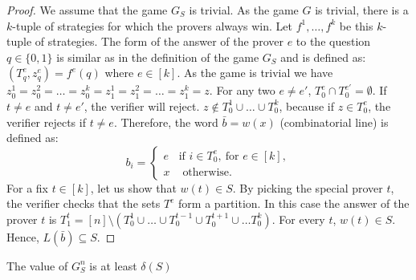 \begin{proof}
We assume that the game $G_S$ is trivial. As the game $G$ is trivial, there is a $k$-tuple of strategies for which the provers  always win.  Let $f^1, \ldots, f^k$ be this $k$-tuple of  strategies. The form of the answer of the prover $e$ to the question $q \in \{0,1\}$ is similar as in the definition of the game $G_S$ and is defined as: $(T_q^e, z_q^e)=f^e(q)$ where $e \in [k]$.  As the game is trivial we have $z_0^1=z_0^2= \ldots=z_0^k=z_1^1=z_1^2= \ldots=z_1^k=z$. 
For any two $e\neq e'$, $T_0^e \cap T_0^{e'}= \emptyset$. If $t \neq e$ and $t\neq e'$, the verifier will reject.
$z \notin T_0^1 \cup \ldots \cup T_0^k$, because if $z \in T_0^e$, the verifier rejects if $t \neq e$. Therefore, the word $\bar{b}=w(x)$ (combinatorial line)  is defined as: $$b_i=\left\lbrace \begin{array}{ll} e & \text{if } i \in T_0^e, \ \text{for }e \in [k], \\ x & \text{ otherwise}.\end{array} \right.$$
For a fix $t \in [k]$, let us show that $w(t) \in S.$ By picking the special prover $t$, the verifier checks that the sets $T^e$ form a partition. In this case the answer of the prover $t$ is $T_1^t=[n] \setminus \left(T_0^1 \cup \ldots \cup T_0^{t-1} \cup T_0^{t+1} \cup \ldots T_0^k	 \right) .$ For every $t$, $w(t) \in S.$ Hence, $L(\bar{b}) \subseteq S.$
\end{proof}


\begin{pro}	 The value of $G_S^n$ is at least $\delta(S)$	  \label{pr3} \end{pro}

